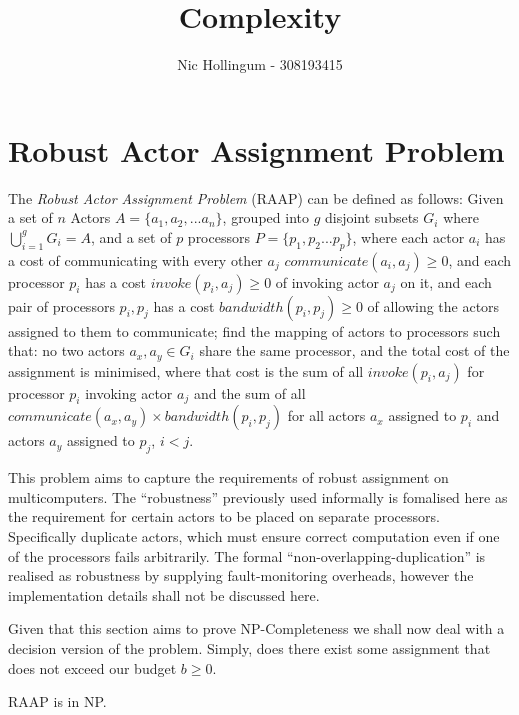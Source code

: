 \documentclass{article}
\author{Nic Hollingum - 308193415}
\title{Complexity}
\begin{document}
\section{Robust Actor Assignment Problem}
The {\em Robust Actor Assignment Problem} (RAAP) can be defined as follows:
Given a set of $n$ Actors $A = \{a_1, a_2, ... a_n\}$, grouped into $g$ disjoint subsets $G_i$ where $\bigcup_{i=1}^{g}{G_i} = A$, and a set of $p$ processors $P = \{p_1, p_2 ... p_p\}$,
where each actor $a_i$ has a cost of communicating with every other $a_j$ $communicate(a_i , a_j) \geq 0$, and each processor $p_i$ has a cost $invoke(p_i, a_j) \geq 0$ of invoking actor $a_j$ on it, and each pair of processors $p_i, p_j$ has a cost $bandwidth(p_i, p_j) \geq 0$ of allowing the actors assigned to them to communicate;
find the mapping of actors to processors such that: no two actors $a_x, a_y \in G_i$ share the same processor, and the total cost of the assignment is minimised, where that cost is the sum of all $invoke(p_i, a_j)$ for processor $p_i$ invoking actor $a_j$ and the sum of all $communicate(a_x, a_y) \times bandwidth(p_i, p_j)$ for all actors $a_x$ assigned to $p_i$ and actors $a_y$ assigned to $p_j$, $i<j$.

This problem aims to capture the requirements of robust assignment on multicomputers.
The ``robustness'' previously used informally is fomalised here as the requirement for certain actors to be placed on separate processors.
Specifically duplicate actors, which must ensure correct computation even if one of the processors fails arbitrarily.
The formal ``non-overlapping-duplication'' is realised as robustness by supplying fault-monitoring overheads, however the implementation details shall not be discussed here.

Given that this section aims to prove NP-Completeness we shall now deal with a decision version of the problem.
Simply, does there exist some assignment that does not exceed our budget $b \geq 0$.

\begin{lemma}
\label{RAAPNP}
RAAP is in NP.
\end{lemma}
\end{document}
